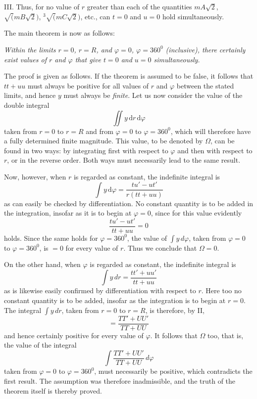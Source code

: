 III. Thus, for no value of $r$ greater than each of the quantities $mA\surd2$, $\surd(mB\surd2)$, ${}^3\!\surd(mC\surd2)$, etc., can $t=0$ and $u=0$ hold simultaneously.

The main theorem is now as follows:

\emph{Within the limits $r=0$, $r=R$, and $\varphi=0$, $\varphi=360^0$ (inclusive), there certainly exist values of $r$ and $\varphi$ that give $t=0$ and $u=0$ simultaneously.}

The proof is given as follows. If the theorem is assumed to be false, it follows that $tt+uu$ must always be positive for all values of $r$ and $\varphi$ between the stated limits, and hence $y$ must always be \emph{finite}. Let us now consider the value of the double integral
\[
\iint y\,\mathrm{d}r\,\mathrm{d}\varphi
\]
taken from $r=0$ to $r=R$ and from $\varphi=0$ to $\varphi=360^0$, which will therefore have a fully determined finite magnitude. This value, to be denoted by $\Omega$, can be found in two ways: by integrating first with respect to $\varphi$ and then with respect to $r$, or in the reverse order. Both ways must necessarily lead to the same result.

Now, however, when $r$ is regarded as constant, the indefinite integral is
\[
\int y\,\mathrm{d}\varphi=\frac{tu'-ut'}{r(tt+uu)}
\]
as can easily be checked by differentiation. No constant quantity
is to be added in the integration, insofar as it is to begin at $\varphi=0$, since for this value evidently
\[
\frac{tu'-ut'}{tt+uu}=0
\]
holds. Since the same holds for $\varphi=360^0$, the value of $\int y\,d\varphi$, taken from $\varphi=0$ to $\varphi=360^0$, is $=0$ for every value of $r$. Thus we conclude that $\Omega=0$.

On the other hand, when $\varphi$ is regarded as constant, the indefinite integral is
\[
\int y\,dr=\frac{tt'+uu'}{tt+uu}
\]
as is likewise easily confirmed by differentiation with respect to $r$. Here too no constant quantity is to be added, insofar as the integration is to begin at $r=0$. The integral $\int y\,dr$, taken from $r=0$ to $r=R$, is therefore, by II,
\[
=\frac{TT'+UU'}{TT+UU}
\]
and hence certainly positive for every value of $\varphi$. It follows that $\Omega$ too, that is, the value of the integral
\[
\int\frac{TT'+UU'}{TT+UU}\,d\varphi
\]
taken from $\varphi=0$ to $\varphi=360^0$, must necessarily be positive, which contradicts the first result. The assumption was therefore inadmissible, and the truth of the theorem itself is thereby proved.

